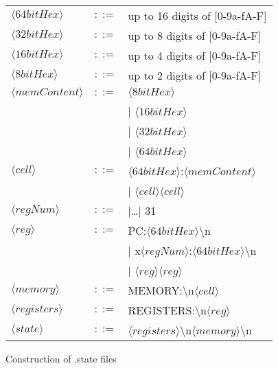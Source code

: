\begin{figure}
    \begin{tabular}{l c >{\ttfamily}l}
        $\langle 64bitHex   \rangle$ & $::=$ & \rmfamily up to 16 digits of [0-9a-fA-F]                                          \\
        $\langle 32bitHex   \rangle$ & $::=$ & \rmfamily up to 8 digits of [0-9a-fA-F]                                           \\
        $\langle 16bitHex   \rangle$ & $::=$ & \rmfamily up to 4 digits of [0-9a-fA-F]                                           \\
        $\langle 8bitHex    \rangle$ & $::=$ & \rmfamily up to 2 digits of [0-9a-fA-F]                                           \\
        $\langle memContent \rangle$ & $::=$ & $\langle 8bitHex\rangle$                                                          \\
                                     &       & | $\langle 16bitHex\rangle$                                                       \\
                                     &       & | $\langle 32bitHex\rangle$                                                       \\
                                     &       & | $\langle 64bitHex\rangle$                                                       \\
        $\langle cell       \rangle$ & $::=$ & $\langle 64bitHex\rangle$:$\langle memContent\rangle$                             \\
                                     &       & | $\langle cell\rangle\langle cell\rangle$                                        \\
        $\langle regNum     \rangle$ & $::=$ & 0 |\dots | 31                                                                     \\
        $\langle reg        \rangle$ & $::=$ & PC:$\langle 64bitHex\rangle$\textbackslash n                                      \\
                                     &       & | x$\langle regNum\rangle$:$\langle64bitHex\rangle$\textbackslash n               \\
                                     &       & | $\langle reg\rangle\langle reg\rangle$                                          \\
        $\langle memory     \rangle$ & $::=$ & MEMORY:\textbackslash n$\langle cell\rangle$                                      \\
        $\langle registers  \rangle$ & $::=$ & REGISTERS:\textbackslash n$\langle reg\rangle$                                    \\
        $\langle state      \rangle$ & $::=$ & $\langle registers\rangle$\textbackslash n$\langle memory\rangle$\textbackslash n \\

    \end{tabular}
    \caption[Construction of .state files]{Construction of .state files}
    \label{statefileform}
\end{figure}